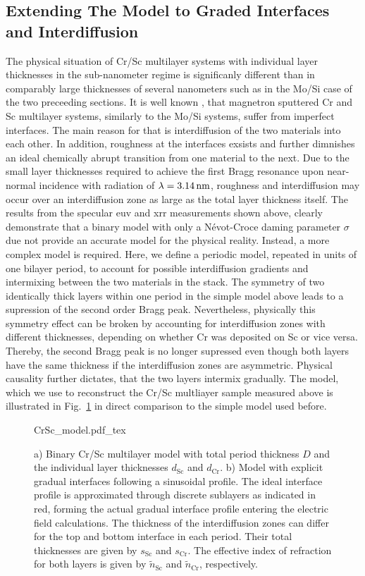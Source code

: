 \subsection{Extending The Model to Graded Interfaces and Interdiffusion} \label{ch_spec:sec_CrSc_gradual_model}
The physical situation of Cr/Sc multilayer systems with individual layer thicknesses in the sub-nanometer regime is significanly different than in comparably large thicknesses of several nanometers such as in the Mo/Si case of the two preceeding sections. It is well known \cite{prasciolu_thermal_2014}, that magnetron sputtered Cr and Sc multilayer systems, similarly to the Mo/Si systems, suffer from imperfect interfaces. The main reason for that is interdiffusion of the two materials into each other. In addition, roughness at the interfaces exsists and further dimnishes an ideal chemically abrupt transition from one material to the next. Due to the small layer thicknesses required to achieve the first Bragg resonance upon near-normal incidence with radiation of $\lambda=\nm{3.14}$, roughness and interdiffusion may occur over an interdiffusion zone as large as the total layer thickness itself. The results from the specular \gls{euv} and \gls{xrr} measurements shown above, clearly demonstrate that a binary model with only a N\'{e}vot-Croce daming parameter $\sigma$ due not provide an accurate model for the physical reality. Instead, a more complex model is required. Here, we define a periodic model, repeated in units of one bilayer period, to account for possible interdiffusion gradients and intermixing between the two materials in the stack. The symmetry of two identically thick layers within one period in the simple model above leads to a supression of the second order Bragg peak. Nevertheless, physically this symmetry effect can be broken by accounting for interdiffusion zones with different thicknesses, depending on whether Cr was deposited on Sc or vice versa. Thereby, the second Bragg peak is no longer supressed even though both layers have the same thickness if the interdiffusion zones are asymmetric. Physical causality further dictates, that the two layers intermix gradually. The model, which we use to reconstruct the Cr/Sc multliayer sample measured above is illustrated in Fig.~\ref{ch_spec:fig_CrScModel} in direct comparison to the simple model used before.
\begin{figure}[htb]
    \def\svgwidth{\textwidth}
    {CrSc_model.pdf_tex}
    \caption[Binary and gradual Cr/Sc multilayer models.]{a) Binary Cr/Sc multilayer model with total period thickness $D$ and 
the individual layer thicknesses $d_\text{Sc}$ and $d_\text{Cr}$. b) Model with 
explicit gradual interfaces following a sinusoidal profile. The ideal interface 
profile is approximated through discrete sublayers as indicated in red, forming 
the actual gradual interface profile entering the electric field calculations. 
The thickness of the interdiffusion zones can differ for the top and bottom 
interface in each period. Their total thicknesses are given by $s_\text{Sc}$ 
and $s_\text{Cr}$. The effective index of refraction for both layers is given 
by $\tilde{n}_\text{Sc}$ and $\tilde{n}_\text{Cr}$, respectively.}
    \label{ch_spec:fig_CrScModel}
\end{figure}
